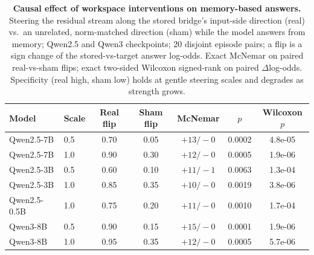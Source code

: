 \begin{table}[t]
\centering
\caption{\textbf{Causal effect of workspace interventions on memory-based answers.} Steering the residual stream
along the stored bridge's input-side direction (real) vs.\ an unrelated,
norm-matched direction (sham) while the model answers from memory; Qwen2.5
and Qwen3 checkpoints; 20 disjoint episode pairs; a flip is a sign change of the
stored-vs-target answer log-odds. Exact McNemar on paired real-vs-sham flips; exact two-sided
Wilcoxon signed-rank on paired $\Delta$log-odds. Specificity (real high, sham
low) holds at gentle steering scales and degrades as strength grows.}
\label{tab:causal}
\small
\begin{tabular}{llccccc}
\toprule
Model & Scale & Real flip & Sham flip & McNemar & $p$ & Wilcoxon $p$ \\
\midrule
Qwen2.5-7B & 0.5 & 0.70 & 0.05 & $+13/-0$ & 0.0002 & 4.8e-05 \\
Qwen2.5-7B & 1.0 & 0.90 & 0.30 & $+12/-0$ & 0.0005 & 1.9e-06 \\
Qwen2.5-3B & 0.5 & 0.60 & 0.10 & $+11/-1$ & 0.0063 & 1.3e-04 \\
Qwen2.5-3B & 1.0 & 0.85 & 0.35 & $+10/-0$ & 0.0019 & 3.8e-06 \\
Qwen2.5-0.5B & 1.0 & 0.75 & 0.20 & $+11/-0$ & 0.0010 & 1.7e-04 \\
Qwen3-8B & 0.5 & 0.90 & 0.15 & $+15/-0$ & 0.0001 & 1.9e-06 \\
Qwen3-8B & 1.0 & 0.95 & 0.35 & $+12/-0$ & 0.0005 & 5.7e-06 \\
\bottomrule
\end{tabular}
\end{table}
